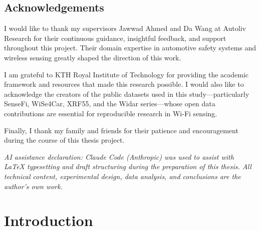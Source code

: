 \documentclass[english,bibtex]{kththesis}
\newenvironment{acknowledgements}{\section*{Acknowledgements}}{}
\begin{document}
\begin{acknowledgements}
I would like to thank my supervisors Jawwad Ahmed and Da Wang at Autoliv Research for their continuous guidance, insightful feedback, and support throughout this project. Their domain expertise in automotive safety systems and wireless sensing greatly shaped the direction of this work.

I am grateful to KTH Royal Institute of Technology for providing the academic framework and resources that made this research possible. I would also like to acknowledge the creators of the public datasets used in this study---particularly SenseFi, WiSe4Car, XRF55, and the Widar series---whose open data contributions are essential for reproducible research in Wi-Fi sensing.

Finally, I thank my family and friends for their patience and encouragement during the course of this thesis project.

\textit{AI assistance declaration: Claude Code (Anthropic) was used to assist with \LaTeX{} typesetting and draft structuring during the preparation of this thesis. All technical content, experimental design, data analysis, and conclusions are the author's own work.}

\acknowlegmentssignature
\end{acknowledgements}

\renewcommand{\chaptermark}[1]{\markboth{#1}{}}
\tableofcontents
\markboth{\contentsname}{}

\cleardoublepage
\listoffigures

\cleardoublepage
\listoftables
\cleardoublepage

\printglossary[style=mylong, type=\acronymtype, title={List of acronyms and abbreviations}]

\label{pg:lastPageofPreface}

\mainmatter
\glsresetall
\renewcommand{\chaptermark}[1]{\markboth{#1}{}}

\chapter{Introduction}
\label{ch:introduction}
\end{document}
